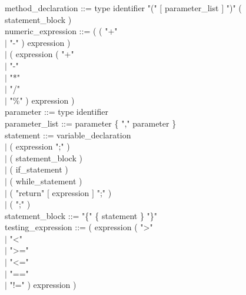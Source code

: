 \documentclass[10pt,a4paper,titlepage]{article}
\begin{document}
\begin{ttfamily}
method\_declaration ::= type identifier "(" $[$ parameter\_list $]$ ")" ( statement\_block )\\

numeric\_expression ::= ( ( "+" \\
			\hspace*{5.3cm}$\mid$ "-" ) expression ) \\
			\hspace*{4.5cm}$\mid$ ( expression ( "+" \\
				\hspace*{7.7cm}$\mid$ "-" \\
				\hspace*{7.7cm}$\mid$ "*" \\
				\hspace*{7.7cm}$\mid$ "/" \\
				\hspace*{7.7cm}$\mid$ "\%" ) expression ) \\
								
parameter ::= type identifier \\

parameter\_list ::= parameter \{ "," parameter \} \\

statement ::= variable\_declaration \\
		\hspace*{3cm}$\mid$ ( expression ";" ) \\
		\hspace*{3cm}$\mid$ ( statement\_block ) \\
		\hspace*{3cm}$\mid$ ( if\_statement ) \\
		\hspace*{3cm}$\mid$ ( while\_statement ) \\
		\hspace*{3cm}$\mid$ ( "return" $[$ expression $]$ ";" ) \\
		\hspace*{3cm}$\mid$ ( ";" ) \\
		
statement\_block ::= "\{" \{ statement \} "\}" \\

testing\_expression ::= ( expression ( ">" \\
					\hspace*{7cm}$\mid$ "<" \\
					\hspace*{7cm}$\mid$ ">=" \\
					\hspace*{7cm}$\mid$ "<=" \\
					\hspace*{7cm}$\mid$ "==" \\
					\hspace*{7cm}$\mid$ "!=" ) expression ) \\


\end{ttfamily}
\end{document}
